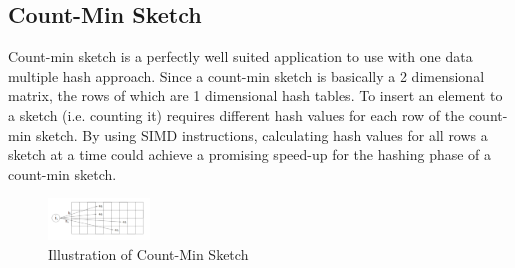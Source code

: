 \documentclass[a0,portrait]{a0poster}
\begin{document}
\begin{minipage}[c]{\linewidth}
\begin{framed}
\begin{multicols}{2}
\subsection{Count-Min Sketch}
Count-min sketch is a perfectly well suited application to use with one data multiple hash approach. Since a count-min sketch is basically a 2 dimensional matrix, the rows of which are 1 dimensional hash tables. To insert an element to a sketch (i.e. counting it) requires different hash values for each row of the count-min sketch. By using  SIMD instructions, calculating hash values for all rows a sketch at a time could achieve a promising speed-up for the hashing phase of a count-min sketch.
\begin{figure}[H]
\centering
\includegraphics[width=0.24\textwidth]{countmin.png}
\caption{Illustration of Count-Min Sketch}
\end{figure}






\end{multicols}
\vspace{0.5cm}
\end{framed}
\end{minipage}
\end{document}
